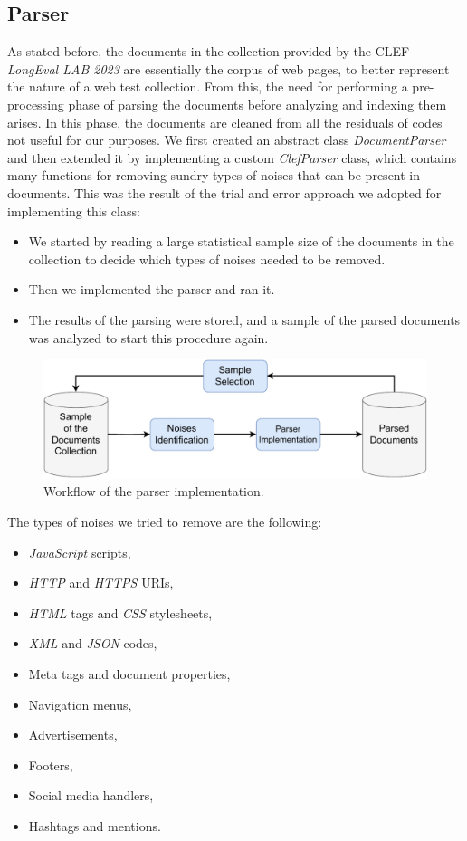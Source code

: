 \subsection{Parser} \label{parser_subsec}
As stated before, the documents in the collection provided by the \ac{CLEF} \textit{LongEval LAB 2023} \cite{cleflongeval} are essentially the corpus of web pages, to better represent the nature of a web test collection.
From this, the need for performing a pre-processing phase of parsing the documents before analyzing and indexing them arises.
In this phase, the documents are cleaned from all the residuals of codes not useful for our purposes. 
We first created an abstract class \textit{DocumentParser} and then extended it by implementing a custom \textit{ClefParser} class, which contains many functions for removing sundry types of noises that can be present in documents. 
This was the result of the trial and error approach we adopted for implementing this class:
\begin{itemize}
\item We started by reading a large statistical sample size of the documents in the collection to decide which types of noises needed to be removed.
\item Then we implemented the parser and ran it.
\item The results of the parsing were stored, and a sample of the parsed documents was analyzed to start this procedure again.
\end{itemize}

\begin{figure}[!h]
    \centering
    \includegraphics[width=0.8\linewidth]{figure/Parser_implementation_workflow.pdf}
    \caption{Workflow of the parser implementation.}
    \label{fig:Parser_implementation_workflow}
\end{figure}

The types of noises we tried to remove are the following:
\begin{itemize}
\item \textit{JavaScript} scripts,
\item \textit{HTTP} and \textit{HTTPS} URIs,
\item \textit{HTML} tags and \textit{CSS} stylesheets,
\item \textit{XML} and \textit{JSON} codes,
\item Meta tags and document properties,
\item Navigation menus,
\item Advertisements,
\item Footers,
\item Social media handlers,
\item Hashtags and mentions.
\end{itemize}

